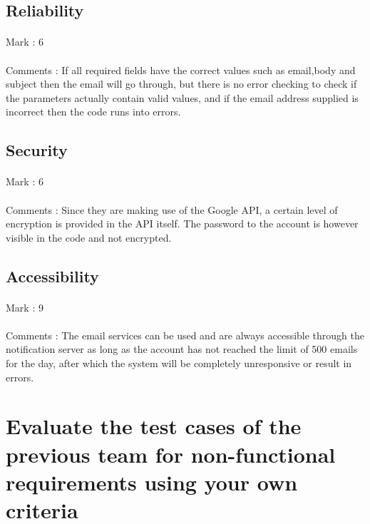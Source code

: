 \documentclass[11pt]{article}
\begin{document}
\subsection{Reliability}
\paragraph{} Mark : 6
\paragraph{} Comments : If all required fields have the correct values such as email,body and subject then the email will go through, but there is no error checking to check if the parameters actually contain valid values, and if the email address supplied is incorrect then the code runs into errors.

\subsection{Security}
\paragraph{} Mark : 6
\paragraph{} Comments : Since they are making use of the Google API, a certain level of encryption is provided in the API itself. The password to the account is however visible in the code and not encrypted. 

\subsection{Accessibility}
\paragraph{} Mark : 9
\paragraph{} Comments : The email services can be used and are always accessible through the notification server as long as the account has not reached the limit of 500 emails for the day, after which the system will be completely unresponsive or result in errors.

\section{Evaluate the test cases of the previous team for non-functional requirements using your own criteria}	
\end{document}
